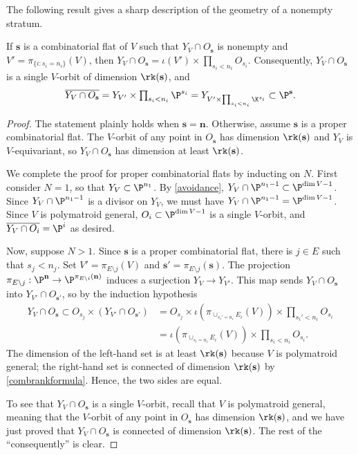 The following result gives a sharp description of the geometry of a nonempty stratum.
\begin{lemm}\label{strata}
  If $\mathbf s$ is a combinatorial flat of $V$ such that $Y_V \cap O_{\mathbf s}$ is nonempty and $V' = \pi_{\{i : s_i = n_i\}}(V)$, then
  $ Y_V \cap O_{\mathbf s} = \iota(V') \times \prod_{s_i < n_i} O_{s_i}$.
  Consequently, $Y_V \cap O_{\mathbf s}$ is a single $V$-orbit of dimension $\rk(\mathbf s)$, and
  \[ \textstyle \overline{Y_V \cap O_{\mathbf s}}  = Y_{V'} \times \prod_{s_i < n_i} \P^{s_i} = Y_{V' \times \prod_{s_i < n_i} \K^{s_i}} \subset \P^{\mathbf s}. \]
\end{lemm}
\begin{proof}
  The statement plainly holds when $\mathbf s = \mathbf n$.
  Otherwise, assume $\mathbf s$ is a proper combinatorial flat.
  The $V$-orbit of any point in $O_{\mathbf s}$ has dimension $\rk(\mathbf s)$ and $Y_V$ is $V$-equivariant, so $Y_V \cap O_{\mathbf s}$ has dimension at least $\rk(\mathbf s)$.
  
  We complete the proof for proper combinatorial flats by inducting on $N$.
  First consider $N = 1$, so that  $Y_V \subset \P^{n_1}$.
  By \cref{avoidance}, $Y_V \cap \P^{n_1 - 1} \subset \P^{\dim V - 1}$.
  Since $Y_V \cap \P^{n_1 - 1}$ is a divisor on $Y_V$, we must have $Y_V \cap \P^{n_1 - 1} = \P^{\dim V - 1}$.
  Since $V$ is polymatroid general, $O_i \subset \P^{\dim V - 1}$ is a single $V$-orbit, and $\overline{Y_V \cap O_i} = \P^{i}$ as desired.

  Now, suppose $N > 1$.
  Since $\mathbf s$ is a proper combinatorial flat, there is $j \in E$ such that $s_j < n_j$.
  Set $V' = \pi_{E \setminus j}(V)$ and $\mathbf s' = \pi_{E \setminus j}(\mathbf s)$.
  The projection $\pi_{E \setminus j}: \P^{\mathbf n} \to \P^{\pi_{E \setminus i}(\mathbf n)}$ induces a surjection $Y_V \to Y_{V'}$. This map sends $Y_V \cap O_{\mathbf s}$ into $Y_{V'} \cap O_{\mathbf s'}$, so by the induction hypothesis
  \begin{align*} 
  \textstyle Y_V \cap O_{\mathbf s} \subset O_{s_j} \times (Y_{V'} \cap O_{\mathbf s'})
    &= O_{s_j} \times \iota(\pi_{\cup_{s_i' = n_i} E_i}( V)) \times \prod_{s_i' < n_i} O_{s_i}\\
    &= \iota(\pi_{\cup_{s_i = n_i} E_i}( V)) \times \prod_{s_i < n_i} O_{s_i}.
  \end{align*}
  The dimension of the left-hand set is at least $\rk(\mathbf s)$ because $V$ is polymatroid general; the right-hand set is connected of dimension  $\rk(\mathbf s)$ by \cref{combrankformula}.
  Hence, the two sides are equal.

  To see that $Y_V \cap O_{\mathbf s}$ is a single $V$-orbit, recall that $V$ is polymatroid general, meaning that the $V$-orbit of any point in $O_{\mathbf s}$ has dimension $\rk(\mathbf s)$, and we have just proved that $Y_V \cap O_{\mathbf s}$ is connected of dimension $\rk(\mathbf s)$.
  The rest of the ``consequently'' is clear.
\end{proof}
